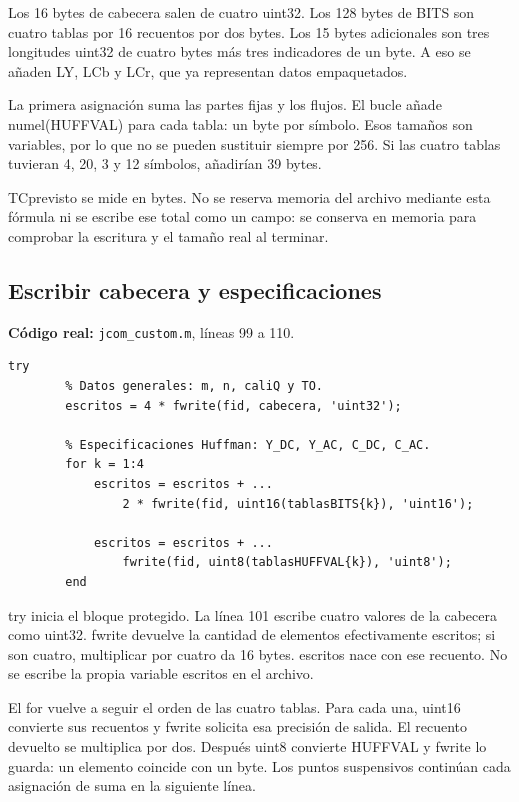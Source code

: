 \documentclass[11pt,a4paper,oneside]{report}
\begin{document}
Los 16 bytes de cabecera salen de cuatro uint32. Los 128 bytes de BITS son
cuatro tablas por 16 recuentos por dos bytes. Los 15 bytes adicionales son
tres longitudes uint32 de cuatro bytes más tres indicadores de un byte.
A eso se añaden LY, LCb y LCr, que ya representan datos empaquetados.

La primera asignación suma las partes fijas y los flujos. El bucle añade
numel(HUFFVAL) para cada tabla: un byte por símbolo. Esos tamaños son variables,
por lo que no se pueden sustituir siempre por 256. Si las cuatro tablas
tuvieran 4, 20, 3 y 12 símbolos, añadirían 39 bytes.

TCprevisto se mide en bytes. No se reserva memoria del archivo mediante esta
fórmula ni se escribe ese total como un campo: se conserva en memoria para
comprobar la escritura y el tamaño real al terminar.


\par\medskip\noindent\begin{minipage}{\linewidth}

\subsection{Escribir cabecera y especificaciones}

\textbf{Código real:} \texttt{jcom\_custom.m}, líneas 99 a 110.

\begin{lstlisting}[firstnumber=99]
    try
        % Datos generales: m, n, caliQ y TO.
        escritos = 4 * fwrite(fid, cabecera, 'uint32');

        % Especificaciones Huffman: Y_DC, Y_AC, C_DC, C_AC.
        for k = 1:4
            escritos = escritos + ...
                2 * fwrite(fid, uint16(tablasBITS{k}), 'uint16');

            escritos = escritos + ...
                fwrite(fid, uint8(tablasHUFFVAL{k}), 'uint8');
        end
\end{lstlisting}

\end{minipage}\par


try inicia el bloque protegido. La línea 101 escribe cuatro valores de la
cabecera como uint32. fwrite devuelve la cantidad de elementos efectivamente
escritos; si son cuatro, multiplicar por cuatro da 16 bytes. escritos nace
con ese recuento. No se escribe la propia variable escritos en el archivo.

El for vuelve a seguir el orden de las cuatro tablas. Para cada una,
uint16 convierte sus recuentos y fwrite solicita esa precisión de salida.
El recuento devuelto se multiplica por dos. Después uint8 convierte HUFFVAL
y fwrite lo guarda: un elemento coincide con un byte. Los puntos suspensivos
continúan cada asignación de suma en la siguiente línea.
\end{document}
